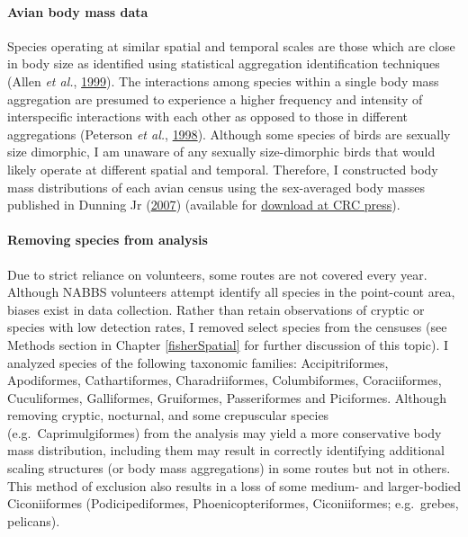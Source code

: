 \documentclass[12pt,twoside,openany]{reedthesis}
\begin{document}
\hypertarget{avian-body-mass-data}{%
\paragraph{Avian body mass data}\label{avian-body-mass-data}}

Species operating at similar spatial and temporal scales are those which are close in body size as identified using statistical aggregation identification techniques (Allen \emph{et al.}, \protect\hyperlink{ref-allen1999body}{1999}). The interactions among species within a single body mass aggregation are presumed to experience a higher frequency and intensity of interspecific interactions with each other as opposed to those in different aggregations (Peterson \emph{et al.}, \protect\hyperlink{ref-peterson1998ecological}{1998}). Although some species of birds are sexually size dimorphic, I am unaware of any sexually size-dimorphic birds that would likely operate at different spatial and temporal. Therefore, I constructed body mass distributions of each avian census using the sex-averaged body masses published in Dunning Jr (\protect\hyperlink{ref-dunning2007crc}{2007}) (available for \href{https://www.crcpress.com/CRC-Handbook-of-Avian-Body-Masses/Dunning-Jr/p/book/9781420064445}{download at CRC press}).

\hypertarget{removing-species-from-analysis}{%
\paragraph{Removing species from analysis}\label{removing-species-from-analysis}}

Due to strict reliance on volunteers, some routes are not covered every year. Although NABBS volunteers attempt identify all species in the point-count area, biases exist in data collection. Rather than retain observations of cryptic or species with low detection rates, I removed select species from the censuses (see Methods section in Chapter \ref{fisherSpatial} for further discussion of this topic). I analyzed species of the following taxonomic families: Accipitriformes, Apodiformes, Cathartiformes, Charadriiformes, Columbiformes, Coraciiformes, Cuculiformes, Galliformes, Gruiformes, Passeriformes and Piciformes. Although removing cryptic, nocturnal, and some crepuscular species (e.g.~Caprimulgiformes) from the analysis may yield a more conservative body mass distribution, including them may result in correctly identifying additional scaling structures (or body mass aggregations) in some routes but not in others. This method of exclusion also results in a loss of some medium- and larger-bodied Ciconiiformes (Podicipediformes, Phoenicopteriformes, Ciconiiformes; e.g.~grebes, pelicans).
\end{document}
